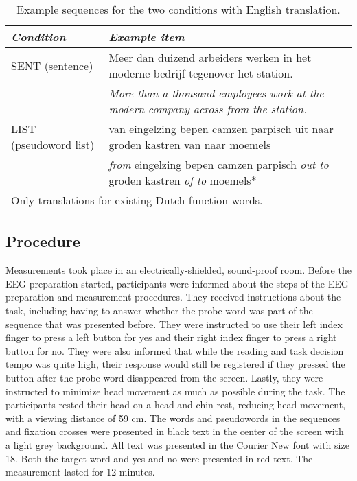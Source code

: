 \begin{table}[ht]
    \captionsetup{justification=raggedright, singlelinecheck=false, font = normal} %
    \renewcommand{\arraystretch}{1.5} %
    \caption{Example sequences for the two conditions with English translation.}
    \label{tab:example_sequences}
    \begin{tabular}{lp{12cm}}
    \hline
    \textit{Condition} & \textit{Example item} \\
    \hline
    SENT (sentence) & Meer dan duizend arbeiders werken in het moderne bedrijf tegenover het station. \\
     & \textit{More than a thousand employees work at the modern company across from the station.} \\
    LIST (pseudoword list) & van eingelzing bepen camzen parpisch uit naar groden kastren van naar moemels \\
     & \textit{from} eingelzing bepen camzen parpisch \textit{out to} groden kastren \textit{of to} moemels* \\
    \hline
    \multicolumn{2}{l}{\footnotesize *Only translations for existing Dutch function words.} \\
    \end{tabular}
\end{table}



\subsection{Procedure}
Measurements took place in an electrically-shielded, sound-proof room. Before the EEG preparation started, participants were informed about the steps of the EEG preparation and measurement procedures. They received instructions about the task, including having to answer whether the probe word was part of the sequence that was presented before. They were instructed to use their left index finger to press a left button for yes and their right index finger to press a right button for no. They were also informed that while the reading and task decision tempo was quite high, their response would still be registered if they pressed the button after the probe word disappeared from the screen. Lastly, they were instructed to minimize head movement as much as possible during the task. The participants rested their head on a head and chin rest, reducing head movement, with a viewing distance of 59 cm. The words and pseudowords in the sequences and fixation crosses were presented in black text in the center of the screen with a light grey background. All text was presented in the Courier New font with size 18. Both the target word and yes and no were presented in red text. The measurement lasted for 12 minutes. 

